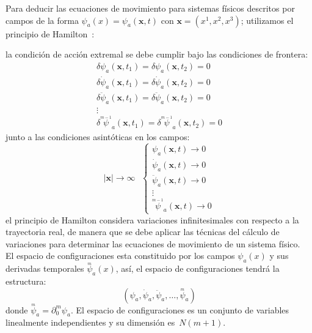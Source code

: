 \documentclass[a4paper,12pt]{article}
\begin{document}
Para \mbox{deducir} las \mbox{ecuaciones} de movimiento para sistemas físicos descritos por campos de la forma \mbox{$\psi_a(x)=\psi_a(\textbf{x},t)$} con $\textbf{x}=(x^1,x^2,x^3)$; utilizamos el principio de \mbox{Hamilton \cite{noether, greiner}:}
\begin{center}
\end{center}
la condición de acción extremal se debe cumplir bajo las condiciones de frontera:
\begin{eqnarray}
\delta \psi_a(\textbf{x},t_1)=\delta \psi_a(\textbf{x},t_2)=0   \\
\label{fronterascam}
\delta \dot \psi_a(\textbf{x},t_1)=\delta\dot  \psi_a(\textbf{x},t_2)=0 \nonumber \\
\delta \ddot \psi_a(\textbf{x},t_1)=\delta\ddot  \psi_a(\textbf{x},t_2)=0\nonumber \\
\vdots\nonumber \\
\delta \overset{_{m-1}}\psi_a(\textbf{x},t_1)=\delta\overset{_{m-1}}\psi_a(\textbf{x},t_2)=0 \nonumber
\end{eqnarray}
junto a las condiciones asintóticas en los campos:
\begin{equation}
|\textbf{x}|\rightarrow\infty \ \ \ \left\{ \begin{array}{lcl}
\psi_a(\textbf{x},t)\rightarrow0 \\
\dot \psi_a(\textbf{x},t)\rightarrow0 \\
\ddot \psi_a(\textbf{x},t)\rightarrow0\\
\vdots \\
\overset{_{m-1}}{\psi}_a(\textbf{x},t)\rightarrow0 
\label{sinto}
\end{array}
\right.
\end{equation}
el principio de Hamilton considera variaciones infinitesimales con respecto a la trayectoria real, de manera que se debe aplicar las técnicas del cálculo de variaciones para determinar las ecuaciones de movimiento de un sistema físico.
\\

El espacio de configuraciones esta constituido por los campos $\psi_a(x)$ y sus derivadas temporales $\overset{_{m}}\psi_a(x)$, así, el espacio de configuraciones tendrá la estructura:
\begin{equation}
(\psi_a,\dot \psi_a,\ddot \psi_a,\dotso,\overset{_{m}}{\psi}_a) 
\end{equation}
donde \mbox{$\overset{_{m}}{\psi}_a=\partial_0^m{\psi}_a$}. El espacio de configuraciones es un conjunto de \mbox{variables} \mbox{linealmente} independientes y su dimensión \mbox{es $N(m+1)$.}
\\
\end{document}
